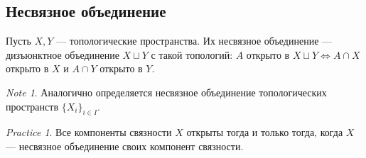 \documentclass[11pt]{book}
\theoremstyle{definition}
\theoremstyle{plain}
\theoremstyle{plain}
\theoremstyle{definition}
\theoremstyle{remark}
\newtheorem*{note}{Note}
\newtheorem*{prac}{Practice}
\begin{document}
\subsection{Несвязное объединение}
\begin{defn}
    Пусть $ X, Y$ --- топологические пространства. Их несвязное объединение --- дизъюнктное объединение $ X \sqcup Y$ с такой топологий:  $ A $ открыто в  $ X \sqcup Y \Longleftrightarrow A \cap X$ открыто в $ X$ и  $ A \cap Y$ открыто в $ Y$.
\end{defn}
\begin{note}
    Аналогично определяется несвязное объединение топологических пространств  $ \{X_i\}_{i \in  I}$.
\end{note}
\begin{prac}
    Все компоненты связности $ X$ открыты  тогда и только тогда, когда $ X$ --- несвязное объединение своих компонент связности.
\end{prac}
\end{document}
